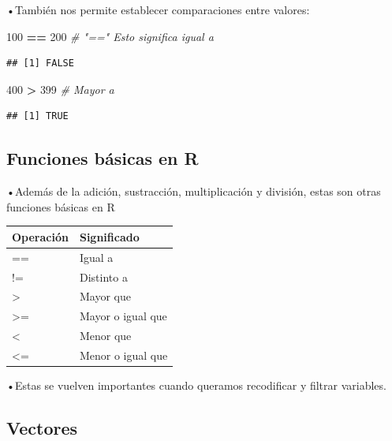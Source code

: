 \documentclass[
]{article}
\newenvironment{Shaded}{\begin{snugshade}}{\end{snugshade}}
\newcommand{\CommentTok}[1]{\textcolor[rgb]{0.56,0.35,0.01}{\textit{#1}}}
\newcommand{\DecValTok}[1]{\textcolor[rgb]{0.00,0.00,0.81}{#1}}
\newcommand{\SpecialCharTok}[1]{\textcolor[rgb]{0.81,0.36,0.00}{\textbf{#1}}}
\begin{document}
•También nos permite establecer comparaciones entre valores:

\begin{Shaded}
\begin{Highlighting}[]
\DecValTok{100} \SpecialCharTok{==} \DecValTok{200} \CommentTok{\# "==" Esto significa igual a}
\end{Highlighting}
\end{Shaded}

\begin{verbatim}
## [1] FALSE
\end{verbatim}

\begin{Shaded}
\begin{Highlighting}[]
\DecValTok{400} \SpecialCharTok{\textgreater{}} \DecValTok{399} \CommentTok{\# Mayor a}
\end{Highlighting}
\end{Shaded}

\begin{verbatim}
## [1] TRUE
\end{verbatim}

\subsection{Funciones básicas en R}\label{funciones-buxe1sicas-en-r-1}

•Además de la adición, sustracción, multiplicación y división, estas son
otras funciones básicas en R

\begin{longtable}[]{@{}ll@{}}
\toprule\noalign{}
Operación & Significado \\
\midrule\noalign{}
\endhead
\bottomrule\noalign{}
\endlastfoot
== & Igual a \\
!= & Distinto a \\
\textgreater{} & Mayor que \\
\textgreater= & Mayor o igual que \\
\textless{} & Menor que \\
\textless= & Menor o igual que \\
\end{longtable}

•Estas se vuelven importantes cuando queramos recodificar y filtrar
variables.

\subsection{Vectores}\label{vectores}
\end{document}
